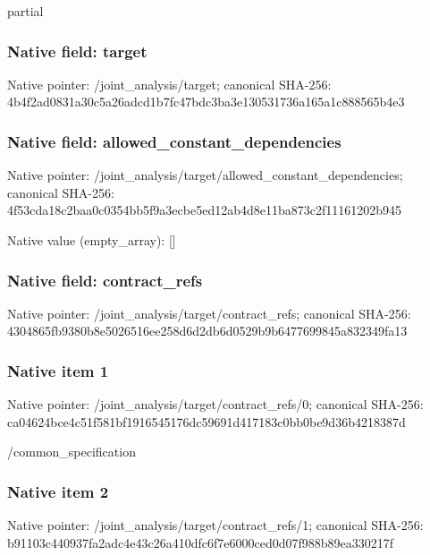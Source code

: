 \documentclass[10pt,a4paper]{article}
\begin{document}
\begingroup\raggedright\sloppy partial\par\endgroup

\subsubsection{Native field: target}
Native pointer: /joint\_\allowbreak{}analysis/target; canonical SHA-256: 4b4f2ad0831a30c5a26adcd1b7fc47bdc3ba3e130531736a165a1c888565b4e3

\subsubsection{Native field: allowed\_\allowbreak{}constant\_\allowbreak{}dependencies}
Native pointer: /joint\_\allowbreak{}analysis/target/allowed\_\allowbreak{}constant\_\allowbreak{}dependencies; canonical SHA-256: 4f53cda18c2baa0c0354bb5f9a3ecbe5ed12ab4d8e11ba873c2f11161202b945

Native value (empty\_\allowbreak{}array): []

\subsubsection{Native field: contract\_\allowbreak{}refs}
Native pointer: /joint\_\allowbreak{}analysis/target/contract\_\allowbreak{}refs; canonical SHA-256: 4304865fb9380b8e5026516ee258d6d2db6d0529b9b6477699845a832349fa13

\subsubsection{Native item 1}
Native pointer: /joint\_\allowbreak{}analysis/target/contract\_\allowbreak{}refs/0; canonical SHA-256: ca04624bce4c51f581bf1916545176dc59691d417183c0bb0be9d36b4218387d

\begingroup\raggedright\sloppy /\allowbreak{}common\_\allowbreak{}specification\par\endgroup

\subsubsection{Native item 2}
Native pointer: /joint\_\allowbreak{}analysis/target/contract\_\allowbreak{}refs/1; canonical SHA-256: b91103c440937fa2adc4e43c26a410dfc6f7e6000ced0d07f988b89ea330217f
\end{document}
